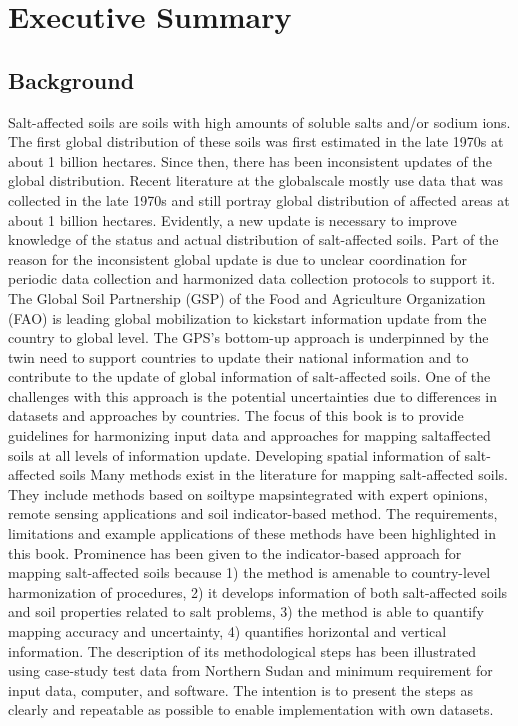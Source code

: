 \documentclass[
  10pt,
  b5paper,
]{book}
\begin{document}
\hypertarget{executive-summary}{%
\chapter*{Executive Summary}\label{executive-summary}}

\hypertarget{background}{%
\section*{Background}\label{background}}

Salt-affected soils are soils with high amounts of soluble salts and/or sodium ions. The first global
distribution of these soils was first estimated in the late 1970s at about 1 billion hectares. Since then,
there has been inconsistent updates of the global distribution. Recent literature at the globalscale mostly
use data that was collected in the late 1970s and still portray global distribution of affected areas at about
1 billion hectares. Evidently, a new update is necessary to improve knowledge of the status and actual
distribution of salt-affected soils. Part of the reason for the inconsistent global update is due to unclear
coordination for periodic data collection and harmonized data collection protocols to support it. The
Global Soil Partnership (GSP) of the Food and Agriculture Organization (FAO) is leading global
mobilization to kickstart information update from the country to global level. The GPS's bottom-up
approach is underpinned by the twin need to support countries to update their national information and
to contribute to the update of global information of salt-affected soils. One of the challenges with this
approach is the potential uncertainties due to differences in datasets and approaches by countries. The
focus of this book is to provide guidelines for harmonizing input data and approaches for mapping saltaffected soils at all levels of information update.
Developing spatial information of salt-affected soils
Many methods exist in the literature for mapping salt-affected soils. They include methods based on soiltype mapsintegrated with expert opinions, remote sensing applications and soil indicator-based method.
The requirements, limitations and example applications of these methods have been highlighted in this
book. Prominence has been given to the indicator-based approach for mapping salt-affected soils
because 1) the method is amenable to country-level harmonization of procedures, 2) it develops
information of both salt-affected soils and soil properties related to salt problems, 3) the method is able
to quantify mapping accuracy and uncertainty, 4) quantifies horizontal and vertical information. The
description of its methodological steps has been illustrated using case-study test data from Northern
Sudan and minimum requirement for input data, computer, and software. The intention is to present the
steps as clearly and repeatable as possible to enable implementation with own datasets.
\end{document}
